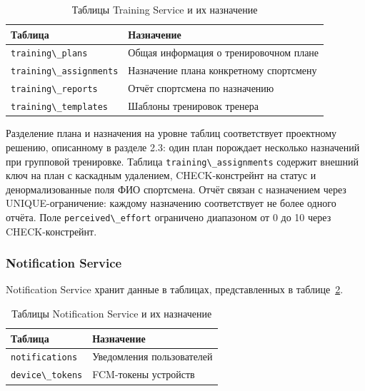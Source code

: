 \begin{longtable}{|>{\raggedright\arraybackslash}p{}|>{\raggedright\arraybackslash}p{}|}
\caption{Таблицы Training Service и их назначение}\label{tab:training-db-tables}\\
\hline
Таблица & Назначение \\
\hline
\endhead
\hline
\endlastfoot
\passthrough{\lstinline!training\_plans!} & Общая информация о тренировочном плане \\ \hline
\passthrough{\lstinline!training\_assignments!} & Назначение плана конкретному спортсмену \\ \hline
\passthrough{\lstinline!training\_reports!} & Отчёт спортсмена по назначению \\ \hline
\passthrough{\lstinline!training\_templates!} & Шаблоны тренировок тренера \\ \hline
\end{longtable}

Разделение плана и назначения на уровне таблиц соответствует проектному решению, описанному в разделе 2.3: один план порождает несколько назначений при групповой тренировке. Таблица \passthrough{\lstinline!training\_assignments!} содержит внешний ключ на план с каскадным удалением, CHECK-констрейнт на статус и денормализованные поля ФИО спортсмена. Отчёт связан с назначением через UNIQUE-ограничение: каждому назначению соответствует не более одного отчёта. Поле \passthrough{\lstinline!perceived\_effort!} ограничено диапазоном от 0 до 10 через CHECK-констрейнт.

\subsubsection{Notification Service}

Notification Service хранит данные в таблицах, представленных в таблице~\ref{tab:notification-db-tables}.

\begin{longtable}{|>{\raggedright\arraybackslash}p{}|>{\raggedright\arraybackslash}p{}|}
\caption{Таблицы Notification Service и их назначение}\label{tab:notification-db-tables}\\
\hline
Таблица & Назначение \\
\hline
\endhead
\hline
\endlastfoot
\passthrough{\lstinline!notifications!} & Уведомления пользователей \\ \hline
\passthrough{\lstinline!device\_tokens!} & FCM-токены устройств \\ \hline
\end{longtable}

